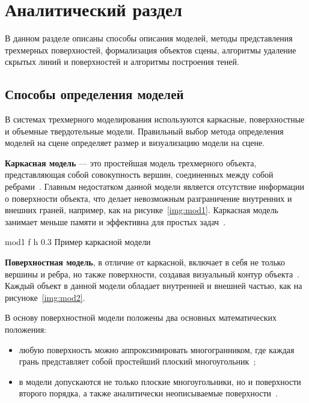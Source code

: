 \chapter{Аналитический раздел}

В данном разделе описаны способы описания моделей, методы представления трехмерных поверхностей, формализация объектов сцены, алгоритмы удаление скрытых линий и поверхностей и алгоритмы построения теней.

\section{Способы определения моделей}

В системах трехмерного моделирования используются каркасные, поверхностные и объемные твердотельные модели. 
Правильный выбор метода определения моделей на сцене определяет размер и визуализацию модели на сцене.

\textbf{Каркасная модель} --- это простейшая модель трехмерного объекта, представляющая собой совокупность вершин, соединенных между собой ребрами~\cite{model_geom}.
Главным недостатком данной модели является отсутствие информации о поверхности объекта, что делает невозможным разграничение внутренних и внешних граней, например, как на рисунке~\ref{img:mod1}.
Каркасная модель занимает меньше памяти и эффективна для простых задач~\cite{model_geom_01}.
 

	{mod1} %
	{f} %
	{h} %
	{0.3\textwidth} %
	{Пример каркасной модели} %
	

\textbf{Поверхностная модель}, в отличие от каркасной, включает в себя не только вершины и ребра, но также поверхности, создавая визуальный контур объекта~\cite{model_geom}. Каждый объект в данной модели обладает внутренней и внешней частью, как на  рисуноке~\ref{img:mod2}.

В основу поверхностной модели положены два основных математических положения:
\begin{itemize}
	\item любую поверхность можно аппроксимировать многогранником, где каждая грань представляет собой простейший плоский многоугольник~\cite{model_geom_01};
	\item в модели допускаются не только плоские многоугольники, но и поверхности второго порядка, а также аналитически неописываемые поверхности~\cite{model_geom_01}.
\end{itemize}

